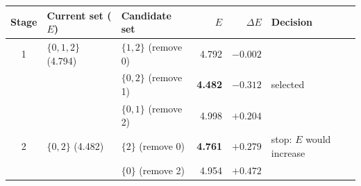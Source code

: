 \begin{tabular}{cllrrl}
\toprule
Stage & Current set ($E$) & Candidate set & $E$ & $\Delta E$ & Decision \\
\midrule
1 & $\{0,1,2\}$ (4.794) & $\{1,2\}$ (remove 0) & 4.792 & $-0.002$ &  \\
& & $\{0,2\}$ (remove 1) & \textbf{4.482} & $-0.312$ & selected \\
& & $\{0,1\}$ (remove 2) & 4.998 & $+0.204$ &  \\
\midrule
2 & $\{0,2\}$ (4.482) & $\{2\}$ (remove 0) & \textbf{4.761} & $+0.279$ & stop: $E$ would increase \\
& & $\{0\}$ (remove 2) & 4.954 & $+0.472$ &  \\
\bottomrule
\end{tabular}

